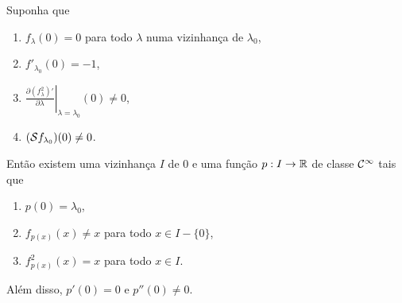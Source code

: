 \begin{theorem}
Suponha que
\begin{enumerate}
\item $f_{\lambda}(0) = 0$ para todo $\lambda$ numa vizinhança de $\lambda_0$,
\item $f'_{\lambda_0}(0) = -1$,
\item $\left. \frac{\partial (f^2_\lambda)'}{\partial \lambda} \right|_{\lambda = \lambda_0}(0) \neq 0$,
\item $(\mathcal{S} f_{\lambda_0})(0) \neq 0$.
\end{enumerate}
Então existem uma vizinhança $I$ de $0$ e uma função $p: I \to \mathbb{R}$ de classe $\mathcal{C}^\infty$ tais que 
\begin{enumerate}
\item $p(0) = \lambda_0$,
\item $f_{p(x)}(x) \neq x$ para todo $x \in I - \lbrace 0 \rbrace$,
\item $f^2_{p(x)}(x) = x$ para todo $x \in I$.
\end{enumerate}
Além disso, $p'(0) = 0$ e $p''(0) \neq 0$.
\end{theorem}

